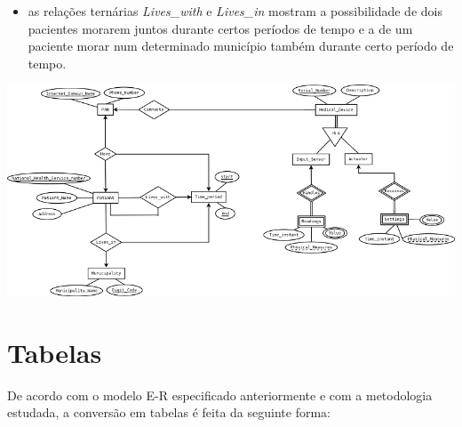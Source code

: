 \documentclass[a4paper]{article}
\begin{document}
\begin{itemize}
	 \item as relações ternárias \textit{Lives\_with} e \textit{Lives\_in} mostram a possibilidade de dois pacientes morarem juntos
	 durante certos períodos de tempo e a de um paciente morar num determinado município também durante certo período de tempo.
\end{itemize}

\pagebreak
\begin{landscape}
\includegraphics{Diagrama1.png}
\end{landscape}
\pagebreak

\section{Tabelas}
De acordo com o modelo E-R especificado anteriormente e com a metodologia estudada, a conversão em tabelas é feita da seguinte forma:
\end{document}
